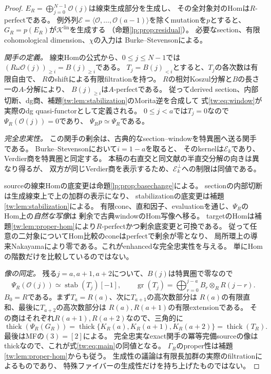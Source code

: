 \begin{proof}
$E_R=\bigoplus_{j=0}^{N-1}\mathcal O(j)$は線束生成部分を生成し、
その全対象対のHomは$R$-perfectである。
例外列$\mathcal E=\langle\mathcal O,\ldots,\mathcal O(a-1)\rangle$を除くmutationを$p$とすると、
$G_R=p(E_R)$が$\mathcal K^{\mathrm{lin}}$を生成する
（命題\ref{lp:prop:residual}）。
必要なsection、有限cohomological dimension、$\chi$の入力は
Burke--Stevenson\cite[Proposition~4.18, Lemmas~6.1--6.2]{LP-BS}による。

\emph{関手の定義。}
線束Homの公式から、$0\le j\le N-1$では
$(R\omega\mathcal O(j))_{\ge i}=B(j)_{\ge i}$である。
$T_j=B(j)_{<i}$とすると、$T_j$の各次数は有限自由で、
$R$のshiftによる有限filtrationを持つ。
$R$の相対Koszul分解と$B$の長さ一の$A$-分解により、
$B(j)_{\ge i}$は$A$-perfectである。
従ってderived section、内部切断、dg商、補題\ref{tw:lem:stabilization}のMorita逆を合成して
式\eqref{tw:eq:window}が実際のdg quasi-functorとして定義される。
$0\le j<a$では$T_j=0$なので$\Psi_R(\mathcal O(j))=0$であり、
$\Psi_Rp\simeq\Psi_R$である。

\emph{完全忠実性。}
この関手の剰余は、古典的なsection--windowを特異圏へ送る関手である。
Burke--Stevenson\cite[Theorem~6.4とその証明]{LP-BS}において$i=1-a$を取ると、
そのkernelは$\mathcal E_k$であり、Verdier商を特異圏と同定する。
本稿の右直交と同文献の半直交分解の向きは異なり得るが、
双方が同じVerdier商を表示するため、$\mathcal E_k^\perp$への制限は同値である。

sourceの線束Homの底変更は命題\ref{lp:prop:basechange}による。
sectionの内部切断は生成線束上で上の加群の表示になり、
stabilizationの底変更は補題\ref{tw:lem:stabilization}による。
有限cone、直和因子、evaluationを通じ、$\Psi_R$のHom上の\emph{自然な写像}は
剰余で古典windowのHom写像へ移る。
targetのHomは補題\ref{tw:lem:proper-hom}により$R$-perfectかつ剰余底変更と可換である。
従って任意の二対象についてHom比較のconeはperfectで剰余が零となり、
局所環上の導来Nakayamaにより零である。これがenhancedな完全忠実性を与える。
単にHomの階数だけを比較しているのではない。

\emph{像の同定。}
残る$j=a,a+1,a+2$について、$B(j)$は特異圏で零なので
\begin{equation}\label{tw:eq:triangular}
 \Psi_R(\mathcal O(j))\simeq\operatorname{stab}(T_j)[-1],\qquad
 \operatorname{gr}(T_j)=\bigoplus_{r=0}^{j-a}B_r\otimes_RR(j-r).
\end{equation}
$B_0=R$である。まず$T_a=R(a)$、次に$T_{a+1}$の高次数部分は
$R(a)$の有限直和、最後に$T_{a+2}$の高次数部分は
$R(a),R(a+1)$の有限extensionである。
その商はそれぞれ$R(a+1),R(a+2)$なので、三角的に
\begin{equation}\label{tw:eq:three-thick}
 \operatorname{thick}(\Psi_R(G_R))
 =\operatorname{thick}\{K_R(a),K_R(a+1),K_R(a+2)\}
 =\operatorname{thick}(T_R).
\end{equation}
最後はMFの$(3)=[2]$による。
完全忠実なexact関手の冪等完備sourceの像はthickなので、これが式\eqref{tw:eq:main}の同値となる。
$\Gamma_R$のproper性は補題\ref{tw:lem:proper-hom}からも従う。
生成性の議論は有限長加群の実際のfiltrationによるものであり、
特殊ファイバーの生成性だけを持ち上げたものではない。


\end{proof}
